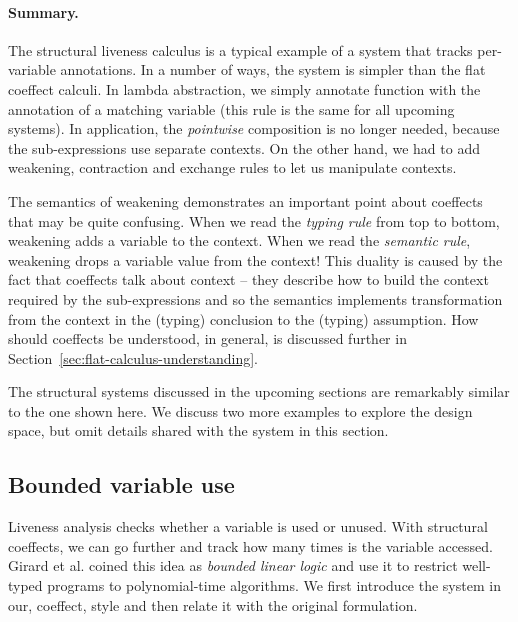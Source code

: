\begin{figure}[t]
\vspace{-0.5em}
\label{fig:applications-struct-livesem}
\end{figure}
\vspace{-0.5em}


\paragraph{Summary.}
The structural liveness calculus is a typical example of a system that tracks per-variable
annotations. In a number of ways, the system is simpler than the flat coeffect calculi. In
lambda abstraction, we simply annotate function with the annotation of a matching variable
(this rule is the same for all upcoming systems). In application, the \emph{pointwise} composition
is no longer needed, because the sub-expressions use separate contexts. On the other hand,
we had to add weakening, contraction and exchange rules to let us manipulate contexts.

The semantics of weakening demonstrates an important point about coeffects that may be quite
confusing. When we read the \emph{typing rule} from top to bottom, weakening adds a variable
to the context. When we read the \emph{semantic rule}, weakening drops a variable value from the
context! This duality is caused by the fact that coeffects talk about context -- they describe
how to build the context required by the sub-expressions and so the semantics implements
transformation from the context in the (typing) conclusion to the (typing) assumption. How
should coeffects be understood, in general, is discussed further in Section~\ref{sec:flat-calculus-understanding}.

The structural systems discussed in the upcoming sections are remarkably similar to the one
shown here. We discuss two more examples to explore the design space, but omit details shared with
the system in this section.


\subsection{Bounded variable use}
\label{sec:applications-struct-bll}

Liveness analysis checks whether a variable is used or unused. With structural coeffects, we can go
further and track how many times is the variable accessed. Girard et al. \cite{logic-bounded} coined
this idea as \emph{bounded linear logic} and use it to restrict well-typed programs to
polynomial-time algorithms. We first introduce the system in our, coeffect, style and then
relate it with the original formulation.


